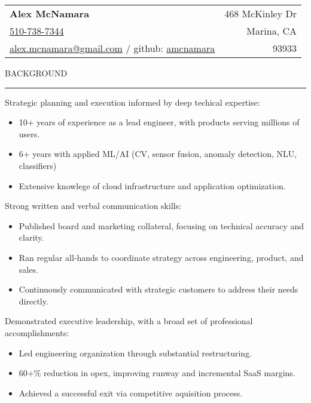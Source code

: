 \documentclass[12pt]{article}
\makeatletter
\newenvironment{justifycolumns}
{\begin{tabular*}{\textwidth}{@{\extracolsep{\fill}} lr@{}}}
{\end{tabular*}}
\newcommand{\row}[2]{#1 & #2 \\}
\newcommand{\blockseparation}{\vspace{0.13in}}
\newcommand{\heading}[1]{
	\vspace{0.05in}
	\uppercase{#1}
	\vspace{0.05in}
	\hrule
	\blockseparation
}
\newcommand{\bulletheading}[1]{
	\vspace{0.075in}
	\hspace{0.1in}
	{#1}
	\vspace{0.03in}
}
\newenvironment{tightbullets}
{\begin{itemize}}
{\end{itemize}}
\makeatother
\begin{document}
\begin{flushleft}

\begin{justifycolumns}
	\row{\large\textbf{Alex McNamara}}{468 McKinley Dr}
	\row{\href{tel:15107387344}{510-738-7344}}{Marina, CA}
	\row{
		\href{mailto:alex.mcnamara@gmail.com}{alex.mcnamara@gmail.com} / github: 
		\href{http://www.github.com/amcnamara}{amcnamara}
	}{93933}
\end{justifycolumns}
\vspace{0.175in}


\heading{Background}
\bulletheading{Strategic planning and execution informed by deep techical expertise:}
\begin{tightbullets}
	\item 10+ years of experience as a lead engineer, with products serving millions of users.
	\item 6+ years with applied ML/AI (CV, sensor fusion, anomaly detection, NLU, classifiers)
	\item Extensive knowlege of cloud infrastructure and application optimization.
\end{tightbullets}

\bulletheading{Strong written and verbal communication skills:}
\begin{tightbullets}
	\item Published board and marketing collateral, focusing on technical accuracy and clarity.
	\item Ran regular all-hands to coordinate strategy across engineering, product, and sales.
	\item Continuously communicated with strategic customers to address their needs directly.
\end{tightbullets}
\bulletheading{Demonstrated executive leadership, with a broad set of professional accomplishments:}
\begin{tightbullets}
	\item Led engineering organization through substantial restructuring.
	\item 60+\% reduction in opex, improving runway and incremental SaaS margins.
	\item Achieved a successful exit via competitive aquisition process.
\end{tightbullets}


\blockseparation



\end{flushleft}
\end{document}
